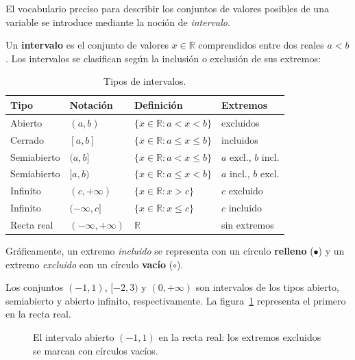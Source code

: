 El vocabulario preciso para describir los conjuntos de valores posibles de una
variable se introduce mediante la noción de \emph{intervalo}.

\begin{definition}[Intervalos]\label{def:intervalos}
Un \textbf{intervalo} es el conjunto de valores $x \in \mathbb{R}$ comprendidos
entre dos reales $a < b$. Los intervalos se clasifican según la inclusión o
exclusión de sus extremos:

\begin{table}[H]
\centering
\renewcommand{\arraystretch}{1.4}
\begin{tabular}{llll}
\hline
\textbf{Tipo} & \textbf{Notación} & \textbf{Definición} & \textbf{Extremos}\\\hline
Abierto        & $(a,b)$     & $\{x \in \mathbb{R} : a < x < b\}$    & excluidos\\
Cerrado        & $[a,b]$     & $\{x \in \mathbb{R} : a \leq x \leq b\}$ & incluidos\\
Semiabierto    & $(a,b]$     & $\{x \in \mathbb{R} : a < x \leq b\}$ & $a$ excl., $b$ incl.\\
Semiabierto    & $[a,b)$     & $\{x \in \mathbb{R} : a \leq x < b\}$ & $a$ incl., $b$ excl.\\
Infinito       & $(c,+\infty)$ & $\{x \in \mathbb{R} : x > c\}$      & $c$ excluido\\
Infinito       & $(-\infty,c]$ & $\{x \in \mathbb{R} : x \leq c\}$   & $c$ incluido\\
Recta real     & $(-\infty,+\infty)$ & $\mathbb{R}$                 & sin extremos\\\hline
\end{tabular}
\caption{Tipos de intervalos.}
\end{table}

Gráficamente, un extremo \emph{incluido} se representa con un círculo
\textbf{relleno} ($\bullet$) y un extremo \emph{excluido} con un círculo
\textbf{vacío} ($\circ$).
\end{definition}

\begin{example}
Los conjuntos $(-1,1)$, $[-2,3)$ y $(0,+\infty)$ son intervalos de los tipos
abierto, semiabierto y abierto infinito, respectivamente. La
figura~\ref{fig:intervalo_abierto} representa el primero en la recta real.

\begin{figure}[!htbp]
\centering
{}
\caption{El intervalo abierto $(-1,1)$ en la recta real: los extremos
excluidos se marcan con círculos vacíos.}
\label{fig:intervalo_abierto}
\end{figure}
\end{example}


